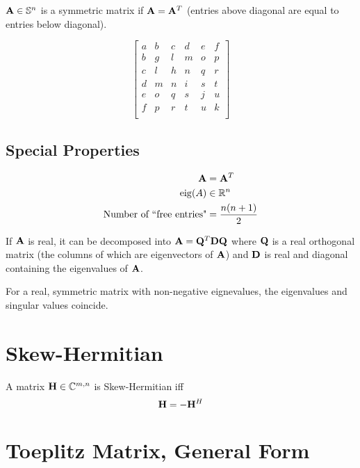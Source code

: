 $\mathbf{A}\in\mathbb{S}^{n}$ is a symmetric matrix if $\mathbf{A}=\mathbf{A}^T$ (entries above diagonal are equal to entries below diagonal).

\begin{equation}
\begin{bmatrix}
a & b & c & d & e & f \\
b & g & l & m & o & p \\
c & l & h & n & q & r \\
d & m & n & i & s & t \\
e & o & q & s & j & u \\
f & p & r & t & u & k \\
\end{bmatrix}
\end{equation}


\subsection*{Special Properties}

\begin{align}
\mathbf{A}                                &=   \mathbf{A}^T \\
\operatorname{eig}(A)                            &\in \mathbb{R}^{n}  \\
\textrm{Number of ``free entries"} &=    \frac{n(n+1)}{2}
\end{align}

If $\mathbf{A}$ is real, it can be decomposed into $\mathbf{A}=\mathbf{Q}^T\mathbf{D}\mathbf{Q}$ where $\mathbf{Q}$ is a real orthogonal matrix (the columns of which are eigenvectors of $\mathbf{A}$) and $\mathbf{D}$ is real and diagonal containing the eigenvalues of $\mathbf{A}$.

For a real, symmetric matrix with non-negative eignevalues, the eigenvalues and singular values coincide.



\section{Skew-Hermitian}
A matrix $\mathbf{H}\in\mathbb{C}^{m,n}$ is Skew-Hermitian iff
\begin{equation}
\mathbf{H}=-\mathbf{H}^H
\end{equation}



\section{Toeplitz Matrix, General Form}

